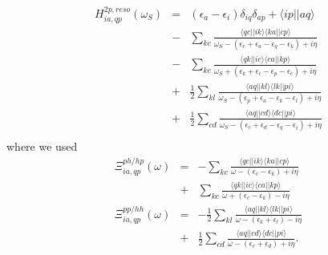 \documentclass[a4paper,superscriptaddress,twocolumn,aps,prb,floatfix,citeautoscript]{revtex4-1}\usepackage[utf8]{inputenc}
\begin{document}
\begin{eqnarray}
  H^{2p,reso}_{ia,qp}(\omega_S)&=&(\epsilon_a-\epsilon_i)\delta_{iq}\delta_{ap} +\langle ip||aq\rangle\nonumber\\
 &-&\sum_{kc}\frac{\langle qc||ik\rangle\langle ka||cp\rangle}{\omega_S-(\epsilon_c+\epsilon_a-\epsilon_{q}-\epsilon_k)+i\eta}\nonumber\\
 &-&\sum_{kc}\frac{\langle qk||ic\rangle\langle ca||kp\rangle}{\omega_S+(\epsilon_k+\epsilon_i-\epsilon_p-\epsilon_c)+i\eta}\nonumber\\
 &+&\frac{1}{2}\sum_{kl}\frac{\langle aq||kl\rangle\langle lk||pi\rangle}{\omega_S-(\epsilon_p+\epsilon_a-\epsilon_k-\epsilon_l)+i\eta}\nonumber\\
 &+&\frac{1}{2}\sum_{cd}\frac{\langle aq||cd\rangle\langle dc||pi\rangle}{
\omega_S-(\epsilon_c+\epsilon_d-\epsilon_{q}-\epsilon_i)+i\eta}\nonumber\\
  \end{eqnarray}
where we used 
\begin{eqnarray}
\Xi^{ph/hp}_{ia,qp}(\omega)&=&-\sum_{kc}\frac{\langle qc||ik\rangle\langle ka||cp\rangle}{\omega-(\epsilon_c-\epsilon_k)+i\eta}\nonumber\\
&+&\sum_{kc}\frac{\langle qk||ic\rangle\langle ca||kp\rangle}{\omega+(\epsilon_c-\epsilon_k)-i\eta}\\
\Xi^{pp/hh}_{ia,qp}(\omega)&=&-\frac{1}{2}\sum_{kl}\frac{\langle aq||kl\rangle\langle lk||pi\rangle}{\omega-(\epsilon_k+\epsilon_l)-i\eta}\nonumber\\
&+&\frac{1}{2}\sum_{cd}\frac{\langle aq||cd\rangle\langle dc||pi\rangle}{\omega-(\epsilon_c+\epsilon_d)+i\eta}.
\end{eqnarray}
\end{document}
